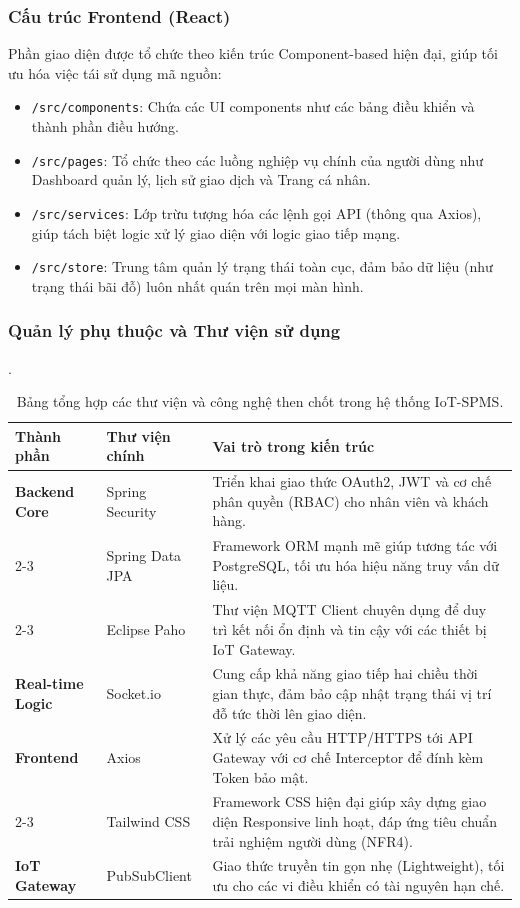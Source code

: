 \subsubsection{Cấu trúc Frontend (React)}
Phần giao diện được tổ chức theo kiến trúc Component-based hiện đại, giúp tối ưu hóa việc tái sử dụng mã nguồn:
\begin{itemize}
    \item \texttt{/src/components}: Chứa các UI components như  các bảng điều khiển và thành phần điều hướng.
    \item \texttt{/src/pages}: Tổ chức theo các luồng nghiệp vụ chính của người dùng như Dashboard quản lý, lịch sử giao dịch và Trang cá nhân.
    \item \texttt{/src/services}: Lớp trừu tượng hóa các lệnh gọi API (thông qua Axios), giúp tách biệt logic xử lý giao diện với logic giao tiếp mạng.
    \item \texttt{/src/store}: Trung tâm quản lý trạng thái toàn cục, đảm bảo dữ liệu (như trạng thái bãi đỗ) luôn nhất quán trên mọi màn hình.
\end{itemize}

\subsubsection{Quản lý phụ thuộc và Thư viện sử dụng}
.

\begin{table}[H]
\centering
\renewcommand{\arraystretch}{1.3}
\begin{tabularx}{\textwidth}{|l|l|X|}
\hline
\rowcolor[HTML]{EFEFEF} 
\textbf{Thành phần} & \textbf{Thư viện chính} & \textbf{Vai trò trong kiến trúc} \\ \hline
\textbf{Backend Core} & Spring Security & Triển khai giao thức OAuth2, JWT và cơ chế phân quyền (RBAC) cho nhân viên và khách hàng. \\ \cline{2-3} 
 & Spring Data JPA & Framework ORM mạnh mẽ giúp tương tác với PostgreSQL, tối ưu hóa hiệu năng truy vấn dữ liệu. \\ \cline{2-3} 
 & Eclipse Paho & Thư viện MQTT Client chuyên dụng để duy trì kết nối ổn định và tin cậy với các thiết bị IoT Gateway. \\ \hline
\textbf{Real-time Logic} & Socket.io & Cung cấp khả năng giao tiếp hai chiều thời gian thực, đảm bảo cập nhật trạng thái vị trí đỗ tức thời lên giao diện. \\ \hline
\textbf{Frontend} & Axios & Xử lý các yêu cầu HTTP/HTTPS tới API Gateway với cơ chế Interceptor để đính kèm Token bảo mật. \\ \cline{2-3} 
 & Tailwind CSS & Framework CSS hiện đại giúp xây dựng giao diện Responsive linh hoạt, đáp ứng tiêu chuẩn trải nghiệm người dùng (NFR4). \\ \hline
\textbf{IoT Gateway} & PubSubClient & Giao thức truyền tin gọn nhẹ (Lightweight), tối ưu cho các vi điều khiển có tài nguyên hạn chế. \\ \hline
\end{tabularx}
\caption{Bảng tổng hợp các thư viện và công nghệ then chốt trong hệ thống IoT-SPMS.}
\end{table}




